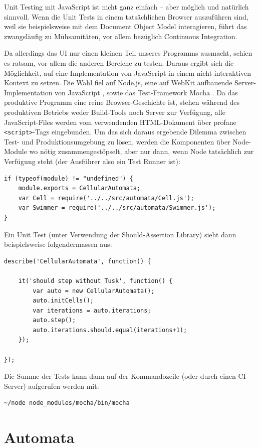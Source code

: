 \documentclass[11pt]{article} %
\theoremstyle{definition}
\begin{document}
Unit Testing mit JavaScript ist nicht ganz einfach -- aber möglich und natürlich sinnvoll. Wenn die Unit Tests in einem tatsächlichen Browser auszuführen sind, weil sie beispielsweise mit dem Document Object Model interagieren, führt das zwangsläufig zu Mühsamitäten, vor allem bezüglich Continuous Integration.

Da allerdings das UI nur einen kleinen Teil unseres Programms ausmacht, schien es ratsam, vor allem die anderen Bereiche zu testen. Daraus ergibt sich die Möglichkeit, auf eine Implementation von JavaScript in einem nicht-interaktiven Kontext zu setzen. Die Wahl fiel auf Node.js, eine auf WebKit aufbauende Server-Implementation von JavaScript \cite{Node}, sowie das Test-Framework Mocha \cite{Mocha}.
Da das produktive Programm eine reine Browser-Geschichte ist, stehen während des produktiven Betriebs weder Build-Tools noch Server zur Verfügung, alle JavaScript-Files werden vom verwendenden HTML-Dokument über profane {\tt <script>}-Tags eingebunden.
Um das sich daraus ergebende Dilemma zwischen Test- und Produktionsumgebung zu lösen, werden die Komponenten über Node-Module wo nötig zusammengestöpselt, aber nur dann, wenn Node tatsächlich zur Verfügung steht (der Ausführer also ein Test Runner ist):

\begin{lstlisting}
if (typeof(module) != "undefined") {
	module.exports = CellularAutomata;
	var Cell = require('../../src/automata/Cell.js');
	var Swimmer = require('../../src/automata/Swimmer.js');
}
\end{lstlisting}

Ein Unit Test (unter Verwendung der Should-Assertion Library) sieht dann beispielsweise folgendermassen aus:

\begin{lstlisting}
describe('CellularAutomata', function() {

	it('should step without Tusk', function() {
		var auto = new CellularAutomata();
		auto.initCells();
		var iterations = auto.iterations;
		auto.step();
		auto.iterations.should.equal(iterations+1);
	});

});
\end{lstlisting}

Die Summe der Tests kann dann auf der Kommandozeile (oder durch einen CI-Server) aufgerufen werden mit:
\begin{verbatim}
~/node node_modules/mocha/bin/mocha
\end{verbatim}

\section{Automata}
\end{document}
